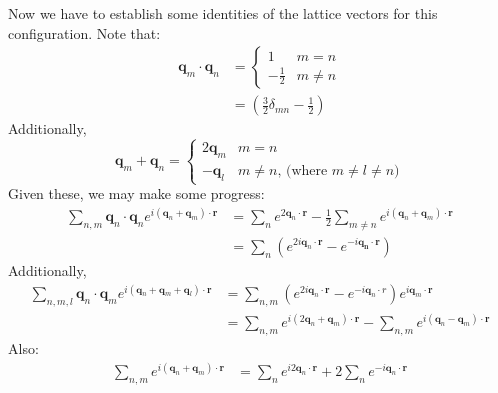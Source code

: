 \documentclass[reqno]{article}
\begin{document}
Now we have to establish some identities of the lattice vectors for this configuration.
Note that:
\begin{equation}
    \begin{split}
    \mathbf{q}_m \cdot \mathbf{q}_n
        &=
    \begin{cases}
        1 & m = n \\
        -\frac12 & m \neq n
    \end{cases} \\
        &=
    \left(\frac32 \delta_{mn} - \frac12\right)
    \end{split}
\end{equation}
Additionally,
\begin{equation}
    \mathbf{q}_m + \mathbf{q}_n
    =
    \begin{cases}
        2 \mathbf{q}_m & m = n \\
        -\mathbf{q}_l & m \neq n \text{, (where } m \neq l \neq n \text{)}
    \end{cases}
\end{equation}
Given these, we may make some progress:
\begin{equation}
    \begin{split}
        \sum_{n, m} \mathbf{q}_n \cdot \mathbf{q}_n e^{i \left(\mathbf{q}_n + \mathbf{q}_m\right) \cdot \mathbf{r}}
        &=
        \sum_n e^{2 \mathbf{q}_n \cdot \mathbf{r}}
        - \frac12 \sum_{m \neq n} e^{i \left(\mathbf{q}_n + \mathbf{q}_m \right) \cdot \mathbf{r}} \\
        &=
        \sum_n \left(e^{2 i \mathbf{q}_n \cdot \mathbf{r}} - e^{- i \mathbf{q_n \cdot \mathbf{r}}}\right)
    \end{split}
\end{equation}
Additionally,
\begin{equation}
    \begin{split}
        \sum_{n, m, l} \mathbf{q}_n \cdot \mathbf{q}_m e^{i \left( \mathbf{q}_n + \mathbf{q}_m + \mathbf{q}_l \right) \cdot \mathbf{r} }
        &=
        \sum_{n, m} \left(e^{2 i \mathbf{q}_n \cdot \mathbf{r}} - e^{-i \mathbf{q}_n \cdot r} \right)
        e^{i \mathbf{q}_m \cdot \mathbf{r}} \\
        &=
        \sum_{n, m} e^{i \left(2 \mathbf{q}_n + \mathbf{q}_m \right) \cdot \mathbf{r}}
        - \sum_{n, m} e^{i \left(\mathbf{q}_n - \mathbf{q}_m \right) \cdot \mathbf{r}}
    \end{split}
\end{equation}
Also:
\begin{equation}
    \begin{split}
        \sum_{n, m} e^{i \left(\mathbf{q}_n + \mathbf{q}_m\right) \cdot \mathbf{r}}
        &=
        \sum_n e^{i 2 \mathbf{q}_n \cdot \mathbf{r}}
        + 2 \sum_n e^{-i \mathbf{q}_n \cdot \mathbf{r}}
    \end{split}
\end{equation}
\end{document}
